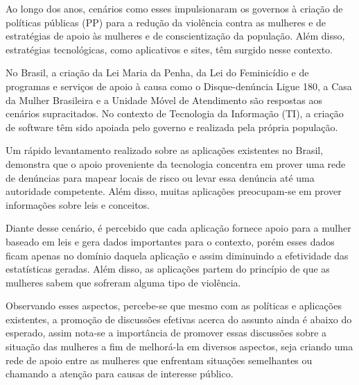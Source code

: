 Ao longo dos anos, cenários como esses impulsionaram os governos à criação de políticas públicas (PP) para a redução da violência 
contra as mulheres e de estratégias de apoio às mulheres e de conscientização da população. Além disso, estratégias tecnológicas, 
como aplicativos e sites, têm surgido nesse contexto.


No Brasil, a criação da Lei Maria da Penha, da Lei do Feminicídio e de programas e serviços de apoio à causa 
como o Disque-denúncia Ligue 180, a Casa da Mulher Brasileira e a Unidade Móvel de Atendimento são respostas aos cenários supracitados. 
No contexto de Tecnologia da Informação (TI), a criação de software têm sido apoiada pelo governo e realizada pela própria população.

Um rápido levantamento realizado sobre as aplicações existentes no Brasil, demonstra que o apoio proveniente da tecnologia concentra em 
prover uma rede de denúncias para mapear locais de risco ou levar essa denúncia até uma autoridade competente. Além disso, muitas aplicações 
preocupam-se em prover informações sobre leis e conceitos.

Diante desse cenário, é percebido que cada aplicação fornece apoio para a mulher baseado em leis e gera dados importantes para o contexto, 
porém esses dados ficam apenas no domínio daquela aplicação e assim diminuindo a efetividade das estatísticas geradas. 
Além disso, as aplicações partem do princípio de que as mulheres sabem que sofreram alguma tipo de violência. 

Observando esses aspectos, percebe-se que mesmo com as políticas e aplicações existentes, a promoção de discussões efetivas acerca do 
assunto ainda é abaixo do esperado, assim nota-se a importância de promover essas discussões sobre a situação das mulheres a fim de 
melhorá-la em diversos aspectos, seja criando uma rede de apoio entre as mulheres que enfrentam situações semelhantes ou chamando a atenção 
para causas de interesse público.



